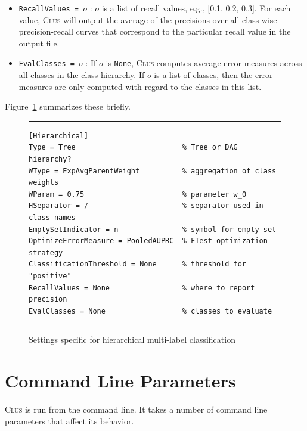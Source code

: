 \documentclass[a4paper]{report}
\newcommand{\clus}{\textsc{Clus}}
\begin{document}
\begin{itemize}
\item {\tt RecallValues = $o$} : $o$ is a list of recall values, e.g., [0.1, 0.2, 0.3]. For each value, \clus{} will output the average of the precisions over all class-wise precision-recall curves that correspond to the particular recall value in the output file.
\item {\tt EvalClasses = $o$} : If $o$ is {\tt None}, \clus{} computes average error measures across all classes in the class  hierarchy. If $o$ is a list of classes, then the error measures are only computed with regard to the classes in this list.
\end{itemize}

Figure~\ref{settings-hmc:fig} summarizes these briefly.

\begin{figure}[tb]
\hrule
\begin{verbatim}
[Hierarchical]
Type = Tree                         % Tree or DAG hierarchy?
WType = ExpAvgParentWeight          % aggregation of class weights
WParam = 0.75                       % parameter w_0
HSeparator = /                      % separator used in class names
EmptySetIndicator = n               % symbol for empty set
OptimizeErrorMeasure = PooledAUPRC  % FTest optimization strategy
ClassificationThreshold = None      % threshold for "positive"
RecallValues = None                 % where to report precision
EvalClasses = None                  % classes to evaluate
\end{verbatim}
\hrule
\caption{Settings specific for hierarchical multi-label classification}
\label{settings-hmc:fig}
\end{figure}

\chapter{Command Line Parameters}
\label{param:ch}

\clus{} is run from the command line.  It takes a number of command line parameters that affect its behavior.
\end{document}
